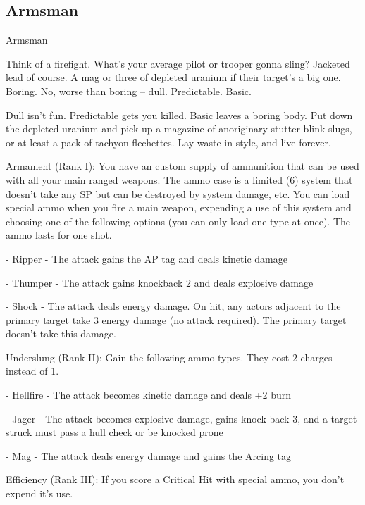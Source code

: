 \subsection{Armsman}


                                                  Armsman

 Think of a firefight. What’s your average pilot or trooper gonna sling? Jacketed lead of course. A mag or
three of depleted uranium if their target’s a big one. Boring. No, worse than boring -- dull. Predictable.
Basic.

Dull isn’t fun. Predictable gets you killed. Basic leaves a boring body. Put down the depleted uranium and
pick up a magazine of anoriginary stutter-blink slugs, or at least a pack of tachyon flechettes. Lay waste in
style, and live forever.

Armament (Rank I): You have an custom supply of ammunition that can be used with all your
main ranged weapons. The ammo case is a limited (6) system that doesn’t take any SP but can
be destroyed by system damage, etc. You can load special ammo when you fire a main weapon,
expending a use of this system and choosing one of the following options (you can only load one
type at once). The ammo lasts for one shot.

         	- Ripper - The attack gains the AP tag and deals kinetic damage

         	- Thumper - The attack gains knockback 2 and deals explosive damage

         	- Shock - The attack deals energy damage. On hit, any actors adjacent to the primary target
         take 3 energy damage (no attack required). The primary target doesn’t take this damage.

Underslung (Rank II): Gain the following ammo types. They cost 2 charges instead of 1.

         	- Hellfire - The attack becomes kinetic damage and deals +2 burn

         - Jager - The attack becomes explosive damage, gains knock back 3, and a target struck
         must pass a hull check or be knocked prone

         	- Mag - The attack deals energy damage and gains the Arcing tag

Efficiency (Rank III): If you score a Critical Hit with special ammo, you don’t expend it’s use.
